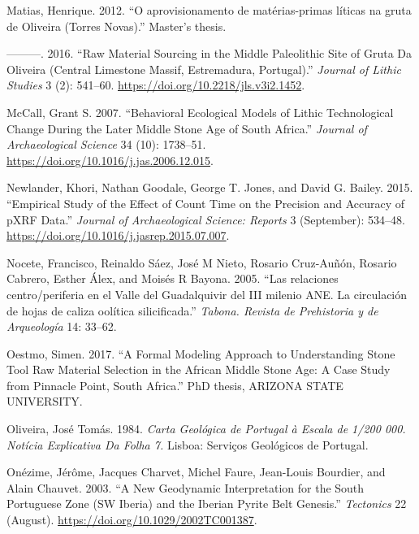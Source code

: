 \documentclass[
  a4paper,
  DIV=11,
  numbers=noendperiod]{scrreprt}
\newlength{\cslhangindent}
\newenvironment{CSLReferences}[2] %
 {\begin{list}{}{%
  \setlength{\itemindent}{0pt}
  \setlength{\leftmargin}{0pt}
  \setlength{\parsep}{0pt}
  \ifodd #1
   \setlength{\leftmargin}{\cslhangindent}
   \setlength{\itemindent}{-1\cslhangindent}
  \fi
  \setlength{\itemsep}{#2\baselineskip}}}
 {\end{list}}
\begin{document}
\begin{CSLReferences}{1}{0}
Matias, Henrique. 2012. {``{O aprovisionamento de mat{é}rias-primas
l{í}ticas na gruta de Oliveira (Torres Novas)}.''} Master's thesis.

---------. 2016. {``Raw Material Sourcing in the {Middle Paleolithic}
Site of {Gruta} Da {Oliveira} ({Central Limestone Massif},
{Estremadura}, {Portugal}).''} \emph{Journal of Lithic Studies} 3 (2):
541--60. \url{https://doi.org/10.2218/jls.v3i2.1452}.

McCall, Grant S. 2007. {``Behavioral Ecological Models of Lithic
Technological Change During the Later {Middle Stone Age} of {South
Africa}.''} \emph{Journal of Archaeological Science} 34 (10): 1738--51.
\url{https://doi.org/10.1016/j.jas.2006.12.015}.

Newlander, Khori, Nathan Goodale, George T. Jones, and David G. Bailey.
2015. {``Empirical Study of the Effect of Count Time on the Precision
and Accuracy of {pXRF} Data.''} \emph{Journal of Archaeological Science:
Reports} 3 (September): 534--48.
\url{https://doi.org/10.1016/j.jasrep.2015.07.007}.

Nocete, Francisco, Reinaldo Sáez, José M Nieto, Rosario Cruz-Auñón,
Rosario Cabrero, Esther Álex, and Moisés R Bayona. 2005. {``{Las
relaciones centro/periferia en el Valle del Guadalquivir del III milenio
ANE. La circulaci{ó}n de hojas de caliza ool{í}tica silicificada}.''}
\emph{Tabona. Revista de Prehistoria y de Arqueolog{í}a} 14: 33--62.

Oestmo, Simen. 2017. {``A {Formal Modeling Approach} to {Understanding
Stone Tool Raw Material Selection} in the {African Middle Stone Age}: {A
Case Study} from {Pinnacle Point}, {South Africa}.''} PhD thesis,
ARIZONA STATE UNIVERSITY.

Oliveira, José Tomás. 1984. \emph{Carta {Geol{ó}gica} de {Portugal} {à}
Escala de 1/200 000. {Not{í}cia Explicativa} Da {Folha} 7.} Lisboa:
Servi{ç}os Geol{ó}gicos de Portugal.

Onézime, Jérôme, Jacques Charvet, Michel Faure, Jean-Louis Bourdier, and
Alain Chauvet. 2003. {``A New Geodynamic Interpretation for the {South
Portuguese Zone} ({SW Iberia}) and the {Iberian Pyrite Belt} Genesis.''}
\emph{Tectonics} 22 (August).
\url{https://doi.org/10.1029/2002TC001387}.


\end{CSLReferences}
\end{document}
